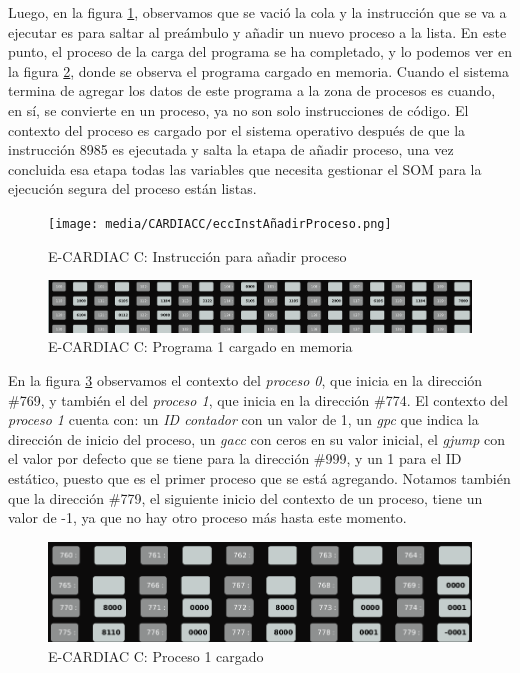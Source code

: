 \documentclass[letterpaper,12pt,oneside]{book}
\begin{document}
		Luego, en la figura \ref{fig:eccAddNewProcesInst}, observamos que se vació la cola y la instrucción que se va a ejecutar 
		es para saltar al preámbulo y añadir un nuevo proceso a la lista. En este punto, el proceso de la carga del programa se ha completado,
		y lo podemos ver en la figura \ref{fig:eccPrograma1Cargado}, donde se observa el programa cargado en
		memoria. Cuando el sistema termina de agregar los datos de este
		programa a la zona de procesos es cuando, en sí, se convierte en un proceso, ya no son solo instrucciones de código. El contexto del proceso 
		es cargado por el sistema operativo después de que la instrucción 8985 es ejecutada y salta la etapa de añadir proceso, una vez
		concluida esa etapa todas las variables que necesita gestionar el SOM para la ejecución segura del proceso están listas.
        \begin{figure}[h]		
			\centering
			\texttt{[image: media/CARDIACC/eccInstAñadirProceso.png]}
			\caption{E-CARDIAC C: Instrucción para añadir proceso}
			\label{fig:eccAddNewProcesInst}
		\end{figure}

        \begin{figure}[h]		
			\centering
			\includegraphics[scale=0.25]{media/CARDIACC/eccPrograma1Cargado.png}
			\caption{E-CARDIAC C: Programa 1 cargado en memoria}
			\label{fig:eccPrograma1Cargado}
		\end{figure}	
  
        En la figura \ref{fig:eccZPProceso1}
		observamos el contexto del \textit{proceso 0}, que inicia en la dirección \#769, y también el del \textit{proceso 1}, que inicia en la dirección 
		\#774.
		El contexto del \textit{proceso 1} cuenta con: un \textit{ID contador}
		con un valor de 1, un \textit{gpc} que indica la dirección de inicio del proceso, un \textit{gacc} con ceros en su valor inicial,
		el \textit{gjump} con el valor por defecto que se tiene para la dirección \#999, y  un 1 para el ID estático, puesto que es el primer 
		proceso que se está agregando. Notamos también que la dirección \#779, el siguiente inicio del contexto de un proceso, tiene un valor de -1, 
		ya que no hay otro proceso más hasta este 
		momento.
		
		\begin{figure}[h]		
			\centering
			\includegraphics[scale=0.45]{media/CARDIACC/eccZonaProcesosPrograma1.png}
			\caption{E-CARDIAC C: Proceso 1 cargado}
			\label{fig:eccZPProceso1}
		\end{figure}	
		
\end{document}
